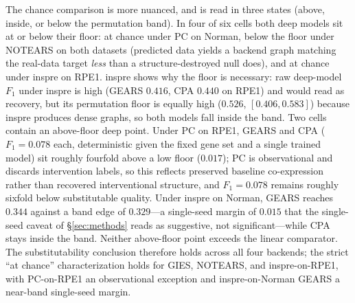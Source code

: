 \documentclass{article}
\theoremstyle{plain}
\theoremstyle{definition}
\theoremstyle{remark}
\begin{document}
The chance comparison is more nuanced, and is read in three states (above, inside, or below the permutation band). In four of six cells both deep models sit at or below their floor: at chance under PC on Norman, below the floor under NOTEARS on both datasets (predicted data yields a backend graph matching the real-data target \emph{less} than a structure-destroyed null does), and at chance under inspre on RPE1. inspre shows why the floor is necessary: raw deep-model $F_1$ under inspre is high (GEARS $0.416$, CPA $0.440$ on RPE1) and would read as recovery, but its permutation floor is equally high ($0.526$, $[0.406, 0.583]$) because inspre produces dense graphs, so both models fall inside the band. Two cells contain an above-floor deep point. Under PC on RPE1, GEARS and CPA ($F_1 = 0.078$ each, deterministic given the fixed gene set and a single trained model) sit roughly fourfold above a low floor ($0.017$); PC is observational and discards intervention labels, so this reflects preserved baseline co-expression rather than recovered interventional structure, and $F_1 = 0.078$ remains roughly sixfold below substitutable quality. Under inspre on Norman, GEARS reaches $0.344$ against a band edge of $0.329$---a single-seed margin of $0.015$ that the single-seed caveat of \S\ref{sec:methods} reads as suggestive, not significant---while CPA stays inside the band. Neither above-floor point exceeds the linear comparator. The substitutability conclusion therefore holds across all four backends; the strict ``at chance'' characterization holds for GIES, NOTEARS, and inspre-on-RPE1, with PC-on-RPE1 an observational exception and inspre-on-Norman GEARS a near-band single-seed margin.
\end{document}
